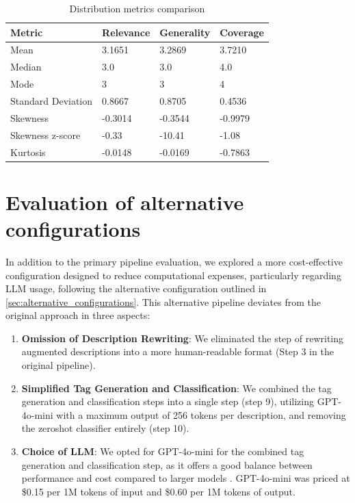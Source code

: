 \begin{table}[htbp]
    \centering
    \caption{Distribution metrics comparison}
    \begin{tabular}{llll}
        \hline
        \textbf{Metric} & \textbf{Relevance} & \textbf{Generality} & \textbf{Coverage} \\
        \hline
        Mean & 3.1651 & 3.2869 & 3.7210 \\
        Median & 3.0 & 3.0 & 4.0 \\
        Mode & 3 & 3 & 4 \\
        Standard Deviation & 0.8667 & 0.8705 & 0.4536 \\
        Skewness & -0.3014 & -0.3544 & -0.9979 \\
        Skewness z-score & -0.33 & -10.41 & -1.08 \\
        Kurtosis & -0.0148 & -0.0169 & -0.7863 \\
        \hline
    \end{tabular}
    \label{tab:distribution_comparison}
\end{table}



\section{Evaluation of alternative configurations}
In addition to the primary pipeline evaluation, we explored a more cost-effective configuration designed to reduce computational expenses, particularly regarding LLM usage, following the alternative configuration outlined in \cref{sec:alternative_configurations}. This alternative pipeline deviates from the original approach in three aspects:

\begin{enumerate}
    \item \textbf{Omission of Description Rewriting}: We eliminated the step of rewriting augmented descriptions into a more human-readable format (Step 3 in the original pipeline).
    \item \textbf{Simplified Tag Generation and Classification}: We combined the tag generation and classification steps into a single step (step 9), utilizing GPT-4o-mini with a maximum output of 256 tokens per description, and removing the zeroshot classifier entirely (step 10).
    \item \textbf{Choice of LLM}: We opted for GPT-4o-mini for the combined tag generation and classification step, as it offers a good balance between performance and cost compared to larger models \cite{noauthor_gpt-4o_nodate}. GPT-4o-mini was priced at \$0.15 per 1M tokens of input and \$0.60 per 1M tokens of output.
\end{enumerate}

